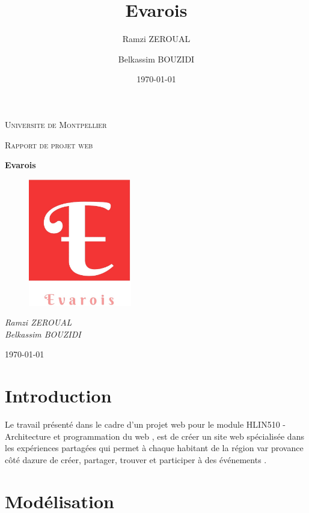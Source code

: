 \documentclass[oneside,11pt,a4paper]{article}
\title{Evarois}
\author{
    Ramzi ZEROUAL \and
    Belkassim BOUZIDI
}
\date{\today}
\begin{document}
\begin{titlepage}
	\centering
	{\scshape\LARGE Universite de Montpellier\par}
	{\scshape\Large Rapport de projet web\par}
	\vspace{1.5cm}
	{\huge\bfseries  Evarois \par}
	\vspace{2cm}
	\begin{figure}[h]
		\centering
		\includegraphics[width=0.4\textwidth]{logo.jpg}
	\end{figure}
	\vspace{2cm}
	{\Large\itshape
	Ramzi ZEROUAL \\
    Belkassim BOUZIDI \\
		\par}

	\vspace{1.5cm}


	
\vfill
	{\large \today\par}
\end{titlepage}
\section{Introduction}

Le travail présenté dans le cadre d'un projet web pour le module  HLIN510 - Architecture et programmation du web  , est de créer un site web spécialisée dans les expériences partagées qui permet à chaque habitant de la région var provance côté dazure de créer, partager, trouver et participer à des événements .

\section{Modélisation}
\end{document}
